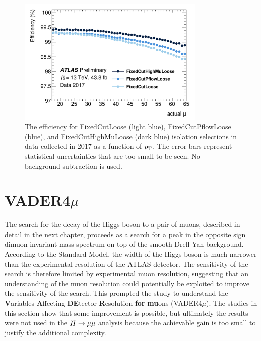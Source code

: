 \begin{figure}[h!]
  \centering
  \includegraphics[width=0.8\textwidth]{figures/muons/newwp}
  \caption[Isolation selection robust to high \pileup~conditions]
  {The efficiency for FixedCutLoose (light blue), FixedCutPflowLoose
  (blue), and FixedCutHighMuLoose (dark blue) isolation selections
  in data collected in 2017 as a function of $p_{\text{T}}$. The error bars represent
  statistical uncertainties that are too small to be seen. No background subtraction is used.
  }
  \label{fig:muon:newwp}
\end{figure}

\section{VADER4$\mu$}

The search for the decay of the Higgs boson to a pair of muons, described
in detail in the next chapter, proceeds as a search for a peak in the
opposite sign dimuon invariant mass spectrum on top
of the smooth Drell-Yan background. According to the Standard Model,
the width of the Higgs boson is much narrower than the experimental
resolution of the ATLAS detector. The sensitivity of the search is
therefore limited by experimental muon resolution, suggesting that an
understanding of the muon resolution could potentially be exploited
to improve the sensitivity of the search. This prompted the study to
understand the \textbf{V}ariables \textbf{A}ffecting \textbf{DE}tector
\textbf{R}esolution \textbf{for} \textbf{mu}ons (VADER4$\mu$).
The studies in this section show that some improvement is possible,
but ultimately the results were not used in the $H \rightarrow \mu\mu$ analysis
because the achievable gain is too small to justify the additional
complexity.

